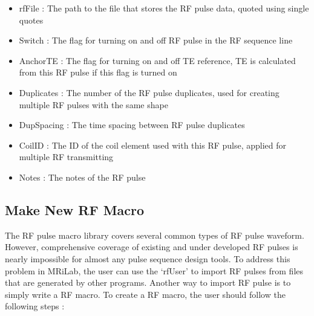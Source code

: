 \documentclass{book}%
\begin{document}
\begin{itemize}
	\item rfFile : The path to the file that stores the RF pulse data, quoted using single quotes
	\item Switch : The flag for turning on and off RF pulse in the RF sequence line
	\item AnchorTE : The flag for turning on and off TE reference, TE is calculated from this RF pulse if this flag is turned on
	\item Duplicates : The number of the RF pulse duplicates, used for creating multiple RF pulses with the same shape
	\item DupSpacing : The time spacing between RF pulse duplicates
	\item CoilID : The ID of the coil element used with this RF pulse, applied for multiple RF transmitting
	\item Notes : The notes of the RF pulse 
\end{itemize}

\subsection{Make New RF Macro}

The RF pulse macro library covers several common types of RF pulse waveform. However, comprehensive coverage of existing and under developed RF pulses is nearly impossible for almost any pulse sequence design tools. To address this problem in MRiLab, the user can use the `rfUser' to import RF pulses from files that are generated by other programs. Another way to import RF pulse is to simply write a RF macro. To create a RF macro, the user should follow the following steps :
\end{document}
